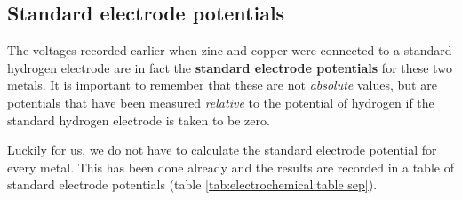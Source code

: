 \subsection{Standard electrode potentials}
\label{subsec:electrochemical:standard potentials}

The voltages recorded earlier when zinc and copper were connected to a standard hydrogen electrode are in fact the \textbf{standard electrode potentials} for these two metals. It is important to remember that these are not \textit{absolute} values, but are potentials that have been measured \textit{relative} to the potential of hydrogen if the standard hydrogen electrode is taken to be zero. 


Luckily for us, we do not have to calculate the standard electrode potential for every metal. This has been done already and the results are recorded in a table of standard electrode potentials (table \ref{tab:electrochemical:table sep}).\\

